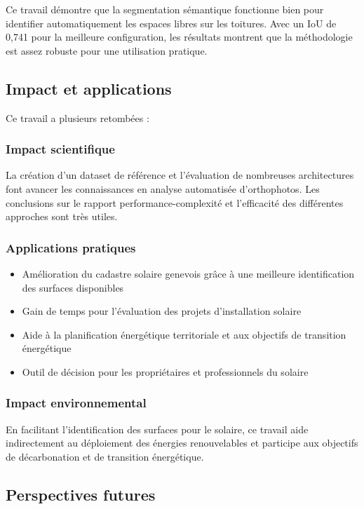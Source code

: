 Ce travail démontre que la segmentation sémantique fonctionne bien pour identifier automatiquement les espaces libres sur les toitures. Avec un IoU de 0,741 pour la meilleure configuration, les résultats montrent que la méthodologie est assez robuste pour une utilisation pratique.

\subsection{Impact et applications}

Ce travail a plusieurs retombées :

\subsubsection{Impact scientifique}
La création d'un dataset de référence et l'évaluation de nombreuses architectures font avancer les connaissances en analyse automatisée d'orthophotos. Les conclusions sur le rapport performance-complexité et l'efficacité des différentes approches sont très utiles.

\subsubsection{Applications pratiques}
\begin{itemize}
    \item Amélioration du cadastre solaire genevois grâce à une meilleure identification des surfaces disponibles
    \item Gain de temps pour l'évaluation des projets d'installation solaire
    \item Aide à la planification énergétique territoriale et aux objectifs de transition énergétique
    \item Outil de décision pour les propriétaires et professionnels du solaire
\end{itemize}

\subsubsection{Impact environnemental}
En facilitant l'identification des surfaces pour le solaire, ce travail aide indirectement au déploiement des énergies renouvelables et participe aux objectifs de décarbonation et de transition énergétique.

\subsection{Perspectives futures}

